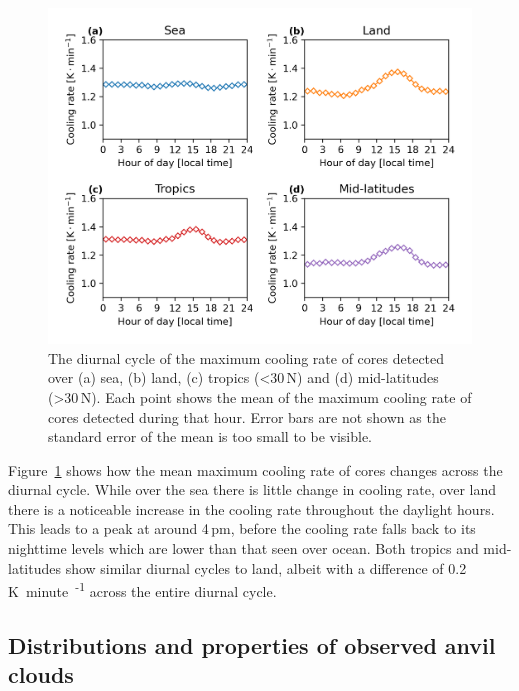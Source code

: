 \begin{figure}[tp]
    \centering
    \includegraphics[width=\textwidth]{figures/chapter2_15.png}
    \caption[
    The diurnal cycle of the maximum cooling rate of cores detected over land, sea, tropics and mid-latitudes
    ]{
    The diurnal cycle of the maximum cooling rate of cores detected over (a) sea, (b) land, (c) tropics (\textless 30\,\textdegree N) and (d) mid-latitudes (\textgreater 30\,\textdegree N). Each point shows the mean of the maximum cooling rate of cores detected during that hour. Error bars are not shown as the standard error of the mean is too small to be visible.
    }
    \label{fig:core_diurnal_cooling_rate}
\end{figure}

Figure~\ref{fig:core_diurnal_cooling_rate} shows how the mean maximum cooling rate of cores changes across the diurnal cycle.
While over the sea there is little change in cooling rate, over land there is a noticeable increase in the cooling rate throughout the daylight hours.
This leads to a peak at around 4\,pm, before the cooling rate falls back to its nighttime levels which are lower than that seen over ocean.
Both tropics and mid-latitudes show similar diurnal cycles to land, albeit with a difference of 0.2\,\unit{K minute\textsuperscript{-1}} across the entire diurnal cycle.


\subsection{Distributions and properties of observed anvil clouds} \label{sec:anvil_properties}

